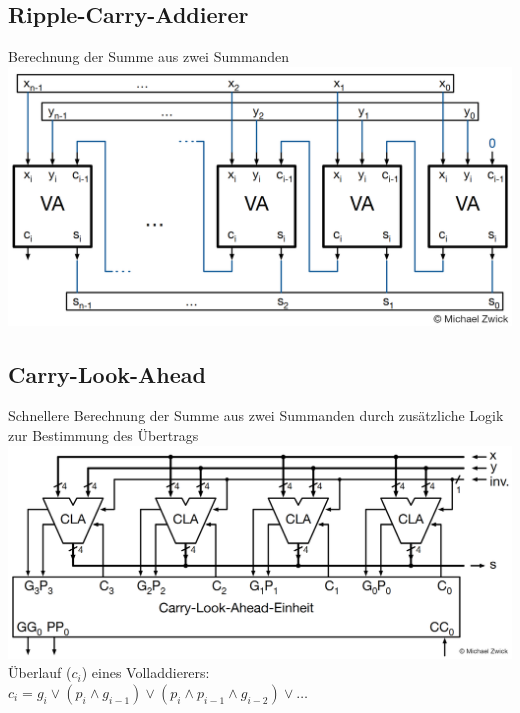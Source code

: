 \documentclass[german, threecolumn, 8pt]{latex4ei/latex4ei_sheet}
\begin{document}
\subsection{Ripple-Carry-Addierer}
Berechnung der Summe aus zwei Summanden \\
\includegraphics[width=.9\linewidth]{img/rca/rca.png} \\
\subsection{Carry-Look-Ahead}
Schnellere Berechnung der Summe aus zwei Summanden durch zusätzliche Logik zur Bestimmung des Übertrags\\
\includegraphics[width=.95\linewidth]{img/rca/cla.png} \\
Überlauf ($c_i$) eines Volladdierers:\\
$c_i=g_i \lor (p_i \land g_{i-1}) \lor (p_i \land p_{i-1} \land g_{i-2}) \lor \dots$\\
\end{document}
